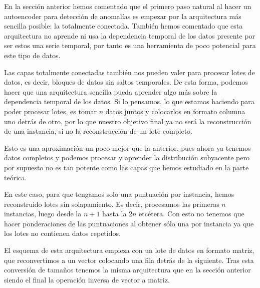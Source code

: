 En la sección anterior hemos comentado que el primero paso natural al hacer un autoencoder para detección de anomalías es empezar por la arquitectura más sencilla posible: la totalmente conectada. También hemos comentado que esta arquitectura no aprende ni usa la dependencia temporal de los datos presente por ser estos una serie temporal, por tanto es una herramienta de poco potencial para este tipo de datos.

Las capas totalmente conectadas también nos pueden valer para procesar lotes de datos, es decir, bloques de datos sin saltos temporales. De esta forma, podemos hacer que una arquitectura sencilla pueda aprender algo más sobre la dependencia temporal de los datos. Si lo pensamos, lo que estamos haciendo para poder procesar lotes, es tomar $n$ datos juntos y colocarlos en formato columna uno detrás de otro, por lo que nuestro objetivo final ya no será la reconstrucción de una instancia, si no la reconstrucción de un lote completo.

Esto es una aproximación un poco mejor que la anterior, pues ahora ya tenemos datos completos y podemos procesar y aprender la distribución subyacente pero por supuesto no es tan potente como las capas que hemos estudiado en la parte teórica.

En este caso, para que tengamos solo una puntuación por instancia, hemos reconstruido lotes sin solapamiento. Es decir, procesamos las primeras $n$ instancias, luego desde la $n+1$ hasta la $2n$ etcétera. Con esto no tenemos que hacer ponderaciones de las puntuaciones al obtener sólo una por instancia ya que los lotes no contienen datos repetidos.

El esquema de esta arquitectura empieza con un lote de datos en formato matriz, que reconvertimos a un vector colocando una fila detrás de la siguiente. Tras esta conversión de tamaños tenemos la misma arquitectura que en la sección anterior siendo el final la operación inversa de vector a matriz.

